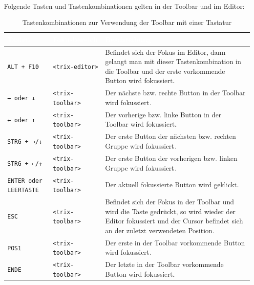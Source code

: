 \newpage
\mbox{}\\
Folgende Tasten und Tastenkombinationen gelten in der Toolbar und im Editor:

\begin{table}[H]
	\begin{center}
	\begin{tabularx}{\textwidth}{| p{2.5cm} | l | X |}
		\hline
		\cellcolor{Gray}\textcolor{White}{Tasten} & \cellcolor{Gray}\textcolor{White}{Fokusbereich} & \cellcolor{Gray}\textcolor{White}{Beschreibung} \\
		\hline
		\texttt{ALT + F10} & \texttt{<trix-editor>} & Befindet sich der Fokus im Editor, dann gelangt man mit dieser Tastenkombination in die Toolbar
		und der erste vorkommende Button wird fokussiert.\\
		\hline
		\texttt{→ oder ↓} & \texttt{<trix-toolbar>} & Der nächste bzw. rechte Button in der Toolbar wird fokussiert.\\
		\hline
		\texttt{← oder ↑} & \texttt{<trix-toolbar>} & Der vorherige bzw. linke Button in der Toolbar wird fokussiert.\\
		\hline
		\texttt{STRG + →/↓} & \texttt{<trix-toolbar>} & Der erste Button der nächsten bzw. rechten Gruppe wird fokussiert.\\
		\hline
		\texttt{STRG + ←/↑} & \texttt{<trix-toolbar>} & Der erste Button der vorherigen bzw. linken Gruppe wird fokussiert.\\
		\hline
		\texttt{ENTER oder LEERTASTE} & \texttt{<trix-toolbar>} & Der aktuell fokussierte Button wird geklickt.\\
		\hline
		\texttt{ESC} & \texttt{<trix-toolbar>} & Befindet sich der Fokus in der Toolbar und wird die Taste gedrückt, so wird wieder der Editor fokussiert
		und der Cursor befindet sich an der zuletzt verwendeten Position.\\
		\hline
		\texttt{POS1} & \texttt{<trix-toolbar>} & Der erste in der Toolbar vorkommende Button wird fokussiert.\\
		\hline
		\texttt{ENDE} & \texttt{<trix-toolbar>} & Der letzte in der Toolbar vorkommende Button wird fokussiert.\\
		\hline
	\end{tabularx}
	\end{center}
	\caption{Tastenkombinationen zur Verwendung der Toolbar mit einer Tastatur}
\end{table}

